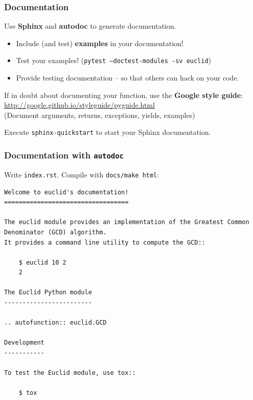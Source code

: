 \documentclass{beamer} %
\newcommand\emc[1]{\textcolor{brightblue}{\textbf{#1}}}
\begin{document}
\begin{frame}

\frametitle{Documentation}

Use \emc{Sphinx} and \emc{autodoc} to generate documentation. 
\begin{itemize}
  \item Include (and test) \emc{examples} in your documentation!
  \item Test your examples! (\texttt{pytest --doctest-modules -sv euclid})
  \item Provide testing documentation -- so that others can hack on your code.
\end{itemize}

\vspace{3mm}
If in doubt about documenting your function, use the \emc{Google style guide}:
\url{http://google.github.io/styleguide/pyguide.html}
\\(Document arguments, returns, exceptions, yields, examples)

\vspace{3mm}
Execute \texttt{sphinx-quickstart} to start your Sphinx documentation.
\end{frame}


\begin{frame}[fragile]

\frametitle{Documentation with \texttt{autodoc}}

Write \texttt{index.rst}. Compile with \texttt{docs/make html}:
\begin{tiny}
\begin{verbatim}
Welcome to euclid's documentation!
==================================

The euclid module provides an implementation of the Greatest Common Denominator (GCD) algorithm. 
It provides a command line utility to compute the GCD::

    $ euclid 10 2
    2

The Euclid Python module
------------------------

.. autofunction:: euclid.GCD

Development
-----------

To test the Euclid module, use tox::

    $ tox

\end{verbatim}
\end{tiny}

\end{frame}
\end{document}
